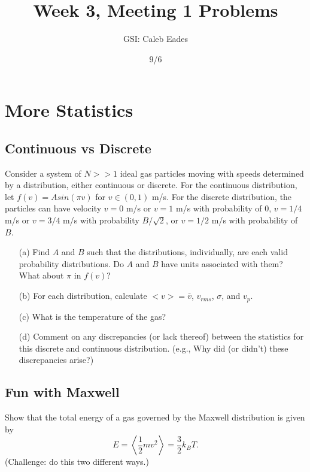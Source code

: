 \documentclass{article}
\begin{document}
	
\title{Week 3, Meeting 1 Problems}
\author{GSI: Caleb Eades}
\date{9/6}
\maketitle

\section{More Statistics}

\subsection{Continuous vs Discrete}

Consider a system of $N>>1$ ideal gas particles moving with speeds determined by a distribution, either continuous or discrete. For the continuous distribution, let $f(v) = Asin(\pi v)$ for $v\in(0,1)$ m/s. For the discrete distribution, the particles can have velocity $v=0$ m/s or $v=1$ m/s with probability of $0$, $v=1/4$ m/s or $v=3/4$ m/s with probability $B/\sqrt{2}$, or $v=1/2$ m/s with probability of $B$.

\begin{itemize}
	\item[(a)] Find $A$ and $B$ such that the distributions, individually, are each valid probability distributions. Do $A$ and $B$ have units associated with them? What about $\pi$ in $f(v)$?
	\item[(b)] For each distribution, calculate $<v> = \bar{v}$, $v_{rms}$, $\sigma$, and $v_p$.
	\item[(c)] What is the temperature of the gas?
	\item[(d)] Comment on any discrepancies (or lack thereof) between the statistics for this discrete and continuous distribution. (e.g., Why did (or didn't) these discrepancies arise?)
\end{itemize}

\subsection{Fun with Maxwell}

Show that the total energy of a gas governed by the Maxwell distribution is given by
\begin{equation}
E = \left<\frac{1}{2}mv^2\right>=\frac{3}{2}k_BT.
\end{equation}
(Challenge: do this two different ways.)

\newpage
\end{document}
